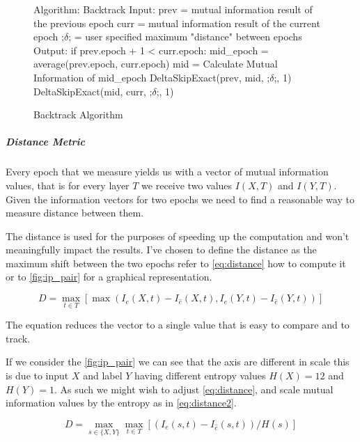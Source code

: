 \documentclass[dissertation.tex]{subfiles}
\begin{document}
\begin{figure}[H]
    \begin{pythonfigure}
      Algorithm: Backtrack
      Input:
      prev = mutual information result of the previous epoch
      curr = mutual information result of the current epoch
      ;$\delta$; = user specified maximum "distance" between epochs
      Output:
      if prev.epoch + 1 < curr.epoch:
        mid_epoch = average(prev.epoch, curr.epoch)
        mid = Calculate Mutual Information of mid_epoch
        DeltaSkipExact(prev, mid, ;$\delta$;, 1)
        DeltaSkipExact(mid, curr, ;$\delta$;, 1)
    \end{pythonfigure}
    \caption{Backtrack Algorithm}
    \label{fig:backtrack}
\end{figure}


  \subparagraph{Distance Metric}
  Every epoch that we measure yields us with a vector of mutual information
  values, that is for every layer $T$ we receive two values $I(X,T)$ and
  $I(Y,T)$. Given the information vectors for two epochs we need to find a
  reasonable way to measure distance between them.

  The distance is used for the purposes of speeding up the computation and won't
  meaningfully impact the results. I've chosen to define the distance as the
  maximum shift between the two epochs refer to \autoref{eq:distance} how to
  compute it or to \autoref{fig:ip_pair} for a graphical representation.

  \begin{equation}
    D = \max_{t\in T} [\max( I_e(X, t) - I_{\hat{e}}(X, t), I_e(Y, t) - I_{\hat{e}}(Y, t))]
    \label{eq:distance}
  \end{equation} 

  The equation reduces the vector to a single value that is easy to compare and
  to track.

  If we consider the \autoref{fig:ip_pair} we can see that the axis are
  different in scale this is due to input $X$ and label $Y$ having different
  entropy values $ H(X) = 12 $ and $ H(Y) = 1 $. As such we might wish to adjust
  \autoref{eq:distance}, and scale mutual information values by the entropy as
  in \autoref{eq:distance2}.

  \begin{equation}
    D = \max_{s\in\{X, Y\}} \max_{t\in T} [(I_e(s, t) - I_{\hat{e}}(s, t)) / H(s)]
    \label{eq:distance2}
  \end{equation} 
\end{document}
